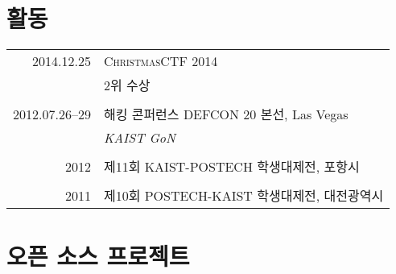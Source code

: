 \documentclass[a4paper,10pt]{article}
\begin{document}
\section{활동}
\begin{tabular}{r|p{11cm}}
  \textsc{2014.12.25} & \textsc{ChristmasCTF 2014} \\
                      & 2위 수상 \\
  \multicolumn{2}{c}{} \\

  \textsc{2012.07.26--29} & \textsc{해킹 콘퍼런스 DEFCON 20 본선}, Las Vegas \\
                          & \emph{KAIST GoN} \\
  \multicolumn{2}{c}{} \\

  \textsc{2012} & \textsc{제11회 KAIST-POSTECH 학생대제전}, 포항시 \\
  \multicolumn{2}{c}{} \\

  \textsc{2011} & \textsc{제10회 POSTECH-KAIST 학생대제전}, 대전광역시 \\
\end{tabular}


%

\section{오픈 소스 프로젝트}
\end{document}

